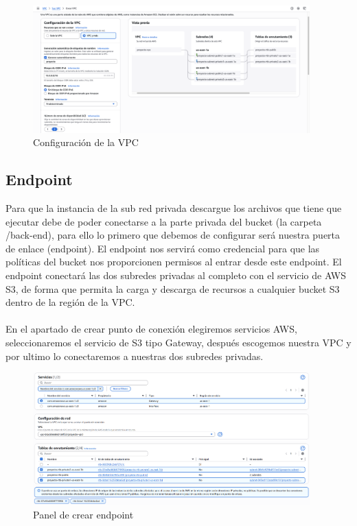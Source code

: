 \documentclass{article}
\begin{document}
	\begin{figure}[H]
	\centering
	\includegraphics[width=0.95\textwidth]{configuracion_VPC.png}
	\caption{Configuración de la VPC}
	\end{figure}
	

	\subsection{Endpoint}

	Para que la instancia de la sub red privada descargue los archivos que tiene que ejecutar debe de poder conectarse a la parte privada del bucket (la carpeta /back-end), para ello lo primero que debemos de configurar será nuestra puerta de enlace (endpoint). El endpoint nos servirá como credencial para que las políticas del bucket nos proporcionen permisos al entrar desde este endpoint. El endpoint conectará las dos subredes privadas al completo con el servicio de AWS S3, de forma que permita la carga y descarga de recursos a cualquier bucket S3 dentro de la región de la VPC.
\\
\\
	En el apartado de crear punto de conexión elegiremos servicios AWS, seleccionaremos el servicio de S3 tipo Gateway, después escogemos nuestra VPC y por ultimo lo conectaremos a nuestras dos subredes privadas.

	\begin{figure}[H]
	\centering
	\includegraphics[width=0.95\textwidth]{crear_endpoint.png}
	\caption{Panel de crear endpoint}
	\end{figure}
\end{document}
